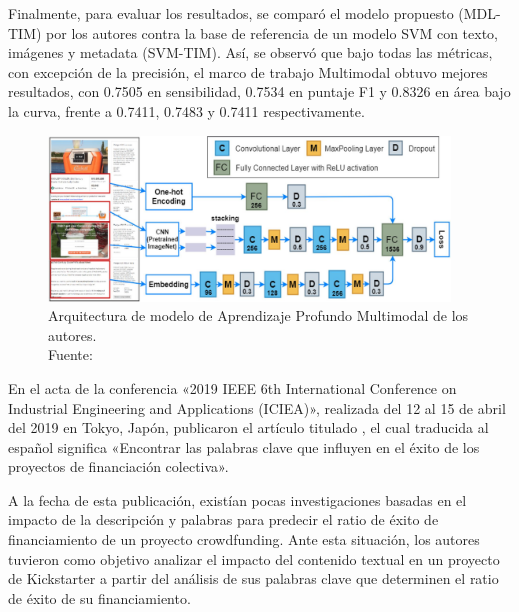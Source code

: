 Finalmente, para evaluar los resultados, se comparó el modelo propuesto (MDL-TIM) por los autores contra la base de referencia de un modelo SVM con texto, imágenes y metadata (SVM-TIM). Así, se observó que bajo todas las métricas, con excepción de la precisión, el marco de trabajo Multimodal obtuvo mejores resultados, con 0.7505 en sensibilidad, 0.7534 en puntaje F1 y 0.8326 en área bajo la curva, frente a 0.7411, 0.7483 y 0.7411 respectivamente.

\begin{figure}[!ht]
	\begin{center}
		\includegraphics[width=0.95\textwidth]{2/figures/cheng2019.jpg}
		\caption[Arquitectura de modelo de Aprendizaje Profundo Multimodal de los autores]{Arquitectura de modelo de Aprendizaje Profundo Multimodal de los autores.\\
			Fuente: \cite{pr_cheng2019deeplearning}}
		\label{2:fig125}
	\end{center}
\end{figure}

En el acta de la conferencia «2019 IEEE 6th International Conference on Industrial Engineering and Applications (ICIEA)», realizada del 12 al 15 de abril del 2019 en Tokyo, Japón, \cite{pr_chen2019keywords_crowdfunding} publicaron el artículo titulado , el cual traducida al español significa «Encontrar las palabras clave que influyen en el éxito de los proyectos de financiación colectiva».

A la fecha de esta publicación, existían pocas investigaciones basadas en el impacto de la descripción y palabras para predecir el ratio de éxito de financiamiento de un proyecto crowdfunding. Ante esta situación, los autores tuvieron como objetivo analizar el impacto del contenido textual en un proyecto de Kickstarter a partir del análisis de sus palabras clave que determinen el ratio de éxito de su financiamiento.

